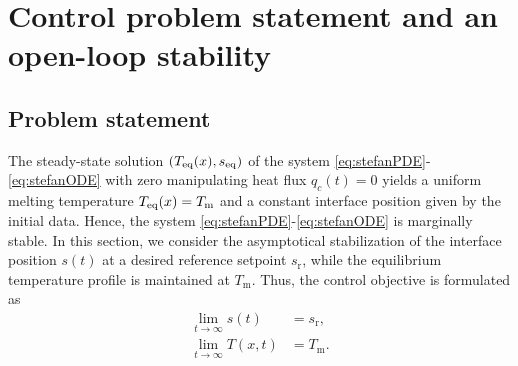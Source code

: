 \documentclass[journal]{IEEEtran}
\begin{document}
\section{Control problem statement and an open-loop stability}\label{open}
\subsection{Problem statement}
The steady-state solution $(T_{{\rm eq}}(x), s_{{\rm eq}})$ of the system \eqref{eq:stefanPDE}-\eqref{eq:stefanODE} with zero manipulating heat flux $q_{c}(t)=0$ yields a uniform melting temperature $T_{{\rm eq}}(x) = T_{{\mathrm m}}$ and a constant interface position given by the initial data. Hence, the system \eqref{eq:stefanPDE}-\eqref{eq:stefanODE} is marginally stable. In this section, we consider the asymptotical stabilization of the interface position $s(t)$ at a desired reference setpoint $s_{{\mathrm r}}$, while the equilibrium temperature profile is maintained  at $T_{{\mathrm m}}$. Thus, the control objective is formulated as
\begin{align}
\lim_{t\to \infty} s(t) &= s_{{\mathrm r}},\label{c1}\\
\lim_{t\to \infty} T(x,t) &= T_{{\mathrm m}}.\label{c2}
\end{align}
\end{document}
